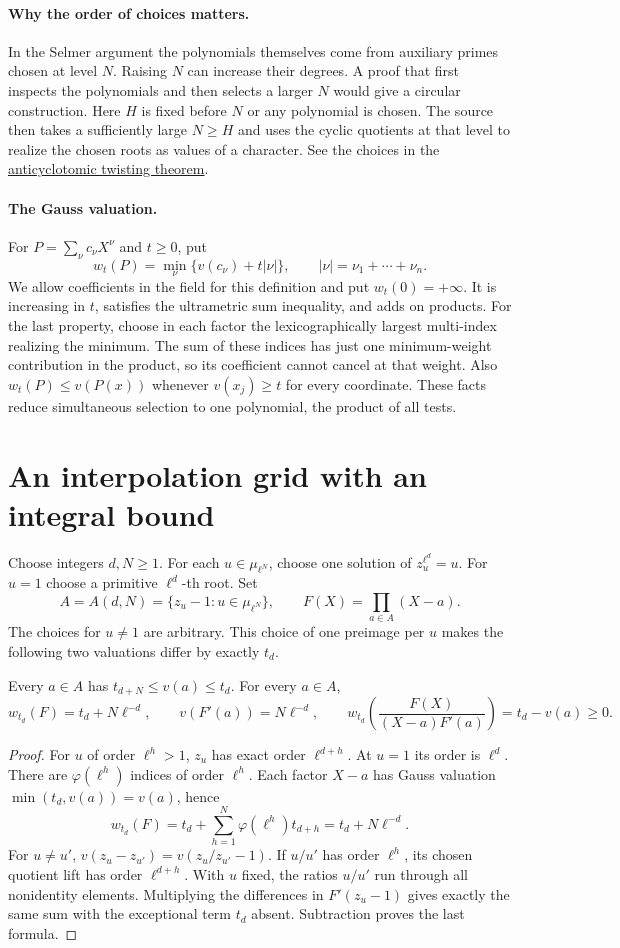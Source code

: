 \documentclass[11pt]{article}
\newcommand{\src}[3]{\href{https://github.com/lsernau/grh-lean/blob/72fead102f663d5c7a407964a13dc0cf9d977207/grh/src/#1.lean\#L#2}{#3}}
\newcommand{\gensrc}[2]{\src{New/Congruences/Selmer/GeneralTheorem}{#1}{#2}}
\begin{document}
\paragraph{Why the order of choices matters.} In the Selmer argument the polynomials themselves come from auxiliary primes chosen at level $N$. Raising $N$ can increase their degrees. A proof that first inspects the polynomials and then selects a larger $N$ would give a circular construction. Here $H$ is fixed before $N$ or any polynomial is chosen. The source then takes a sufficiently large $N\ge H$ and uses the cyclic quotients at that level to realize the chosen roots as values of a character. See the choices in the \gensrc{392}{anticyclotomic twisting theorem}.

\paragraph{The Gauss valuation.} For $P=\sum_\nu c_\nu X^\nu$ and $t\ge0$, put
\[
 w_t(P)=\min_\nu\{v(c_\nu)+t|\nu|\},\qquad |\nu|=\nu_1+\cdots+\nu_n .
\]
We allow coefficients in the field for this definition and put $w_t(0)=+\infty$. It is increasing in $t$, satisfies the ultrametric sum inequality, and adds on products. For the last property, choose in each factor the lexicographically largest multi-index realizing the minimum. The sum of these indices has just one minimum-weight contribution in the product, so its coefficient cannot cancel at that weight. Also $w_t(P)\le v(P(x))$ whenever $v(x_j)\ge t$ for every coordinate. These facts reduce simultaneous selection to one polynomial, the product of all tests.
\newpage
\section{An interpolation grid with an integral bound}\label{sec:grid}
Choose integers $d,N\ge1$. For each $u\in\mu_{\ell^N}$, choose one solution of $z_u^{\ell^d}=u$. For $u=1$ choose a primitive $\ell^d$-th root. Set
\[
 A=A(d,N)=\{z_u-1:u\in\mu_{\ell^N}\},\qquad
 F(X)=\prod_{a\in A}(X-a).
\]
The choices for $u\ne1$ are arbitrary. This choice of one preimage per $u$ makes the following two valuations differ by exactly $t_d$.
\begin{lemma}\label{lem:grid}
Every $a\in A$ has $t_{d+N}\le v(a)\le t_d$. For every $a\in A$,
\[
 w_{t_d}(F)=t_d+N\ell^{-d},\qquad v(F'(a))=N\ell^{-d},\qquad
 w_{t_d}\!\left(\frac{F(X)}{(X-a)F'(a)}\right)=t_d-v(a)\ge0 .
\]
\end{lemma}
\begin{proof}
For $u$ of order $\ell^h>1$, $z_u$ has exact order $\ell^{d+h}$. At $u=1$ its order is $\ell^d$. There are $\varphi(\ell^h)$ indices of order $\ell^h$. Each factor $X-a$ has Gauss valuation $\min(t_d,v(a))=v(a)$, hence
\[
 w_{t_d}(F)=t_d+\sum_{h=1}^{N}\varphi(\ell^h)t_{d+h}
           =t_d+N\ell^{-d}.
\]
For $u\ne u'$, $v(z_u-z_{u'})=v(z_u/z_{u'}-1)$. If $u/u'$ has order $\ell^h$, its chosen quotient lift has order $\ell^{d+h}$. With $u$ fixed, the ratios $u/u'$ run through all nonidentity elements. Multiplying the differences in $F'(z_u-1)$ gives exactly the same sum with the exceptional term $t_d$ absent. Subtraction proves the last formula.
\end{proof}
\end{document}

